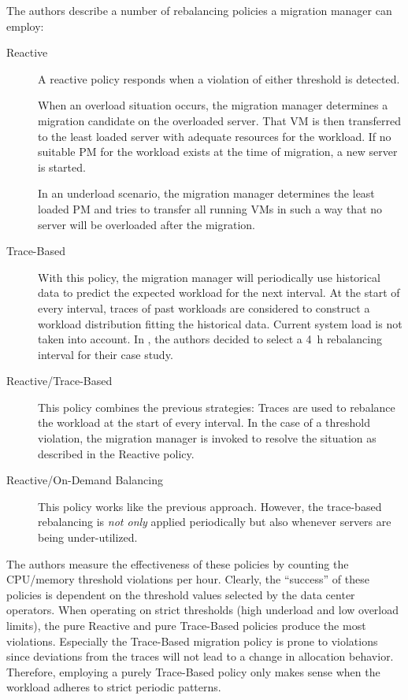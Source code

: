 \documentclass[12pt, a4paper]{scrartcl}
\begin{document}
The authors describe a number of rebalancing policies a migration manager can employ:
\begin{description}
    \item[Reactive]
        A reactive policy responds when a violation of either threshold is detected.

        When an overload situation occurs, the migration manager determines a migration candidate on the overloaded server.
        That \ac{VM} is then transferred to the least loaded server with adequate resources for the workload.
        If no suitable \ac{PM} for the workload exists at the time of migration, a new server is started.

        In an underload scenario, the migration manager determines the least loaded \ac{PM} and tries to transfer all running \acp{VM} in such a way that no server will be overloaded after the migration.

    \item[Trace-Based]
        With this policy, the migration manager will periodically use historical data to predict the expected workload for the next interval.
        At the start of every interval, traces of past workloads are considered to construct a workload distribution fitting the historical data.
        Current system load is not taken into account.  
        In \cite{gmach_resource_2009}, the authors decided to select a 4~h rebalancing interval for their case study.

    \item[Reactive/Trace-Based]
        This policy combines the previous strategies:
        Traces are used to rebalance the workload at the start of every interval.
        In the case of a threshold violation, the migration manager is invoked to resolve the situation as described in the Reactive policy.

    \item[Reactive/On-Demand Balancing]
        This policy works like the previous approach.
        However, the trace-based rebalancing is \emph{not only} applied periodically but also whenever servers are being under-utilized.
\end{description}

The authors measure the effectiveness of these policies by counting the CPU/memory threshold violations per hour.
Clearly, the \enquote{success} of these policies is dependent on the threshold values selected by the data center operators.
When operating on strict thresholds (high underload and low overload limits), the pure Reactive and pure Trace-Based policies produce the most violations.
Especially the Trace-Based migration policy is prone to violations since deviations from the traces will not lead to a change in allocation behavior.
Therefore, employing a purely Trace-Based policy only makes sense when the workload adheres to strict periodic patterns.
\end{document}
